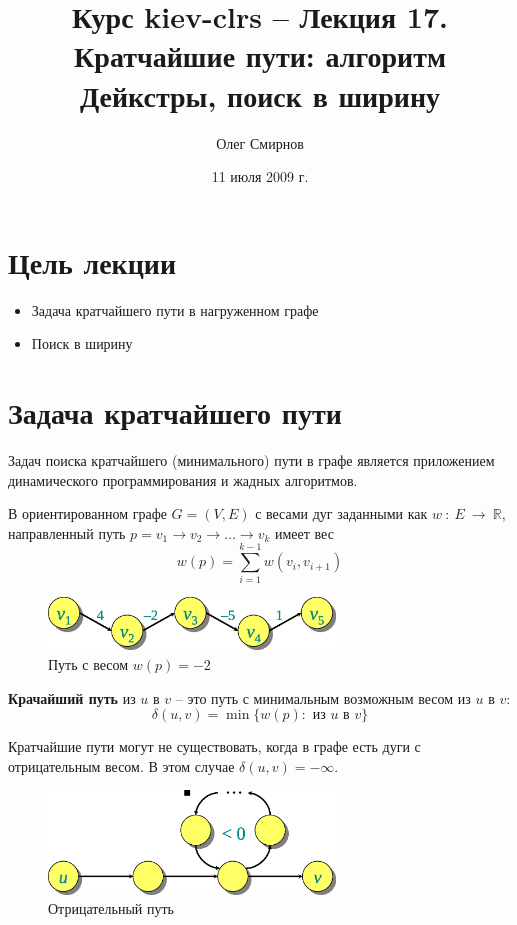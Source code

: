 \documentclass[11pt]{article}
\author{Олег Смирнов}
\title{Курс kiev-clrs -- Лекция 17. Кратчайшие пути: алгоритм Дейкстры, поиск в ширину}
\date{11 июля 2009 г.}
\begin{document}
\maketitle
\tableofcontents
\newpage
\setlength{\parskip}{1ex plus 0.5ex minus 0.2ex}
\section{Цель лекции}
\begin{itemize}
\item Задача кратчайшего пути в нагруженном графе
\item Поиск в ширину
\end{itemize}

\section{Задача кратчайшего пути}
Задач поиска кратчайшего (минимального) пути в графе является приложением динамического программирования и жадных алгоритмов.

В ориентированном графе $G = (V,E)$ с весами дуг заданными как $w~:~E~\to~\mathbb{R}$, направленный путь $p = v_1 \to v_2 \to \ldots \to v_k$ имеет вес
\begin{equation*}
  w(p) = \sum_{i=1}^{k-1}w(v_i, v_{i+1})
\end{equation*}
\begin{figure}[h!]
  \centering
  \includegraphics[width=3in]{lecture17/path1.eps}
  \caption{Путь с весом $w(p) = -2$}
\end{figure}

\textbf{Крачайший путь} из $u$ в $v$ -- это путь с минимальным возможным весом из $u$ в $v$:
\begin{equation*}
  \delta(u, v) = \min\{w(p):\text{ из }u\text{ в }v\}
\end{equation*}

Кратчайшие пути могут не существовать, когда в графе есть дуги с отрицательным весом. В этом случае $\delta(u, v) = -\infty$.
\begin{figure}[h!]
  \centering
  \includegraphics[width=3in]{lecture17/path2.eps}
  \caption{Отрицательный путь}
\end{figure}
\end{document}
